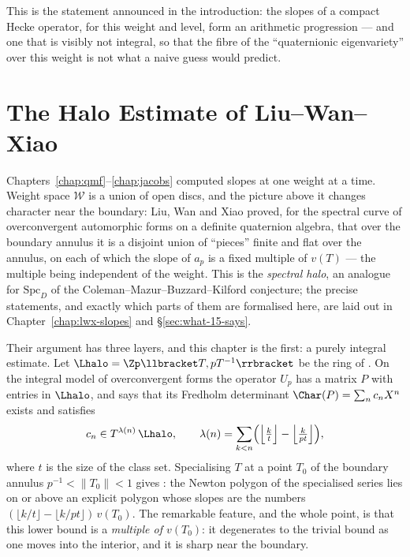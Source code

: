 This is the statement announced in the introduction: the slopes of a compact Hecke operator, for
this weight and level, form an arithmetic progression --- and one that is visibly not integral,
so that the fibre of the ``quaternionic eigenvariety'' over this weight is not what a naive guess
would predict.


\chapter{The Halo Estimate of Liu--Wan--Xiao}
\label{chap:lwx-halo}

Chapters~\ref{chap:qmf}--\ref{chap:jacobs} computed slopes at one weight at a time.  Weight space
$\mathcal{W}$ is a union of open discs, and the picture above it changes character near the
boundary: Liu, Wan and Xiao \cite{LWX} proved, for the spectral curve of overconvergent
automorphic forms on a definite quaternion algebra, that over the boundary annulus it is a
disjoint union of ``pieces'' finite and flat over the annulus, on each of which the slope of
$a_p$ is a fixed multiple of $v(T)$ --- the multiple being independent of the weight.  This is
the \emph{spectral halo}, an analogue for $\mathrm{Spc}_D$ of the Coleman--Mazur--Buzzard--Kilford
conjecture; the precise statements, and exactly which parts of them are formalised here, are
laid out in Chapter~\ref{chap:lwx-slopes} and \S\ref{sec:what-15-says}.

Their argument has three layers, and this chapter is the first: a purely integral estimate.
Let $\Lhalo = \Zp\llbracket T, pT^{-1}\rrbracket$ be the ring of \cite[Lemma 3.15]{LWX}.  On the
integral model of overconvergent forms the operator $U_p$ has a matrix $P$ with entries in
$\Lhalo$, and \cite[Theorem 3.16]{LWX} says that its Fredholm determinant
$\Char(P) = \sum_n c_n X^n$ exists and satisfies
\[
  c_n \in T^{\lambda(n)}\,\Lhalo, \qquad
  \lambda(n) = \sum_{k<n}\Bigl(\Bigl\lfloor \tfrac{k}{t}\Bigr\rfloor -
  \Bigl\lfloor \tfrac{k}{pt}\Bigr\rfloor\Bigr),
\]
where $t$ is the size of the class set.  Specialising $T$ at a point $T_0$ of the boundary
annulus $p^{-1} < \lVert T_0\rVert < 1$ gives \cite[Corollary 3.18]{LWX}: the Newton polygon of
the specialised series lies on or above an explicit polygon whose slopes are the numbers
$(\lfloor k/t\rfloor - \lfloor k/pt\rfloor)\,v(T_0)$.  The remarkable feature, and the whole
point, is that this lower bound is a \emph{multiple of $v(T_0)$}: it degenerates to the trivial
bound as one moves into the interior, and it is sharp near the boundary.

